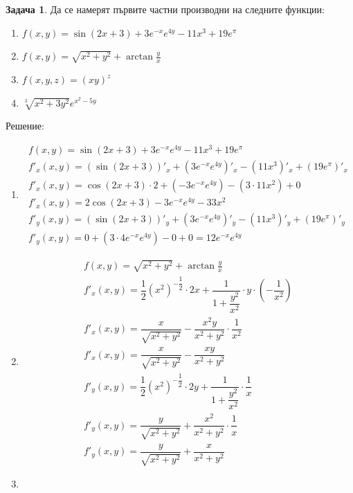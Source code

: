 \documentclass[a4paper,fleqn,12pt]{article}
\theoremstyle{definition}
\newtheorem{task}{Задача}[subsection]
\begin{document}
\begin{task}
Да се намерят първите частни производни на следните функции:
\begin{enumerate}
\item $f(x,y) = \sin{(2x+3)} + 3e^{-x}e^{4y} - 11x^3 + 19e^\pi$
\item $f(x,y) = \sqrt{x^2 + y^2} + \arctan {\frac{y}{x}}$
\item $f(x,y,z) = (xy)^z$
\item $\sqrt[3]{x^2+3y^2} e^{x^2 - 5y}$
\end{enumerate}
Решение: \\

\begin{enumerate}
\item 
\begin{gather*}
f(x,y) = \sin{(2x+3)} + 3e^{-x}e^{4y} - 11x^3 + 19e^\pi \\
f'_x(x,y) = (\sin{(2x+3)})'_x + (3e^{-x}e^{4y})'_x - (11x^3)'_x + (19e^\pi )'_x \\
f'_x(x,y) = \cos{(2x+3)}\cdot 2 + (-3e^{-x}e^{4y}) - (3 \cdot 11x^2) + 0 \\
f'_x(x,y) = 2\cos{(2x+3)} -3e^{-x}e^{4y} - 33x^2 \\
f'_y(x,y) = (\sin{(2x+3)})'_y + (3e^{-x}e^{4y})'_y - (11x^3)'_y + (19e^\pi )'_y \\
f'_y(x,y) = 0 + (3 \cdot 4 e^{-x}e^{4y}) - 0 + 0 = 12e^{-x}e^{4y}
\end{gather*}
\item 
\begin{gather*}
f(x,y) = \sqrt{x^2 + y^2} + \arctan {\frac{y}{x}}\\
f'_x(x,y) = \dfrac{1}{2} (x^2)^{- \dfrac{1}{2}} \cdot 2x + \dfrac{1}{1 + \dfrac{y^2}{x^2}} \cdot y \cdot ( - \dfrac{1}{x^2}) \\
f'_x(x,y) = \dfrac{x}{\sqrt{x^2 + y^2}} - \dfrac{x^2y}{x^2 + y^2} \cdot \dfrac{1}{x^2} \\
f'_x(x,y) = \dfrac{x}{\sqrt{x^2 + y^2}} - \dfrac{xy}{x^2 + y^2} \\
f'_y(x,y) = \dfrac{1}{2} (x^2)^{- \dfrac{1}{2}} \cdot 2y + \dfrac{1}{1 + \dfrac{y^2}{x^2}} \cdot  \dfrac{1}{x} \\
f'_y(x,y) = \dfrac{y}{\sqrt{x^2 + y^2}} + \dfrac{x^2}{x^2 + y^2} \cdot \dfrac{1}{x}\\
f'_y(x,y) = \dfrac{y}{\sqrt{x^2 + y^2}} + \dfrac{x}{x^2 + y^2}
\end{gather*}
\item 
\begin{gather*}

\end{gather*}
\end{enumerate}
\end{task}
\end{document}
